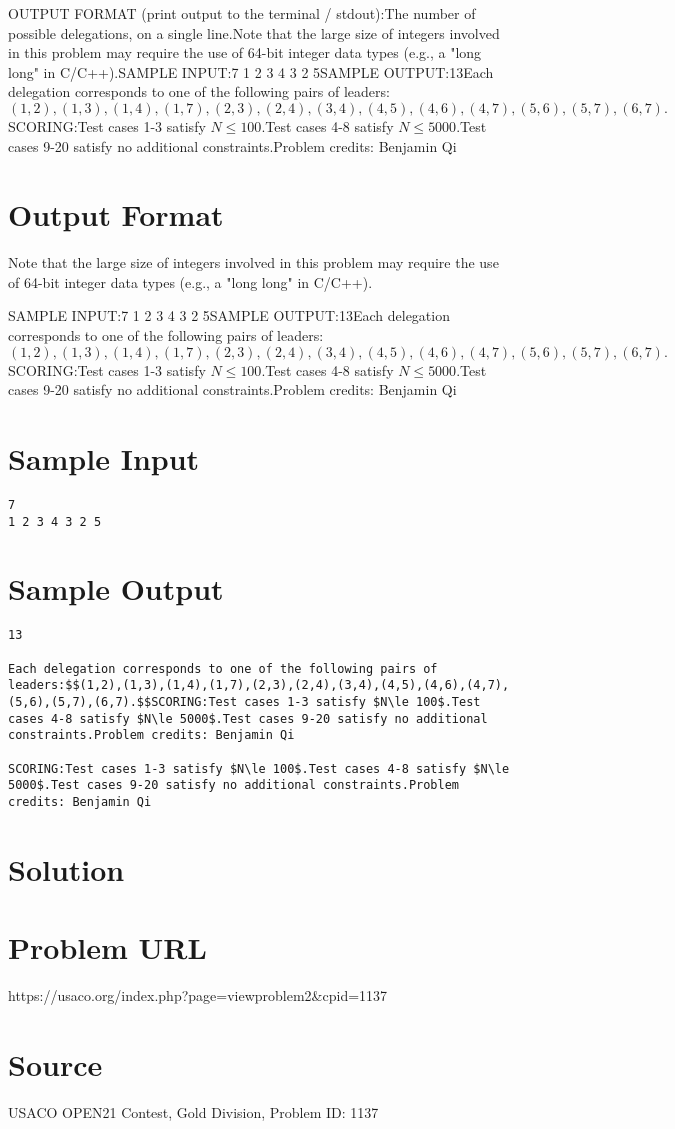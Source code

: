 \documentclass[12pt]{article}
\begin{document}
OUTPUT FORMAT (print output to the terminal / stdout):The number of possible delegations, on a single line.Note that the large size of integers involved in this problem may require the
use of 64-bit integer data types (e.g., a "long long" in C/C++).SAMPLE INPUT:7
1 2 3 4 3 2 5SAMPLE OUTPUT:13Each delegation corresponds to one of the following pairs of leaders:$$(1,2),(1,3),(1,4),(1,7),(2,3),(2,4),(3,4),(4,5),(4,6),(4,7),(5,6),(5,7),(6,7).$$SCORING:Test cases 1-3 satisfy $N\le 100$.Test cases 4-8 satisfy $N\le 5000$.Test cases 9-20 satisfy no additional constraints.Problem credits: Benjamin Qi

\section*{Output Format}
Note that the large size of integers involved in this problem may require the
use of 64-bit integer data types (e.g., a "long long" in C/C++).

SAMPLE INPUT:7
1 2 3 4 3 2 5SAMPLE OUTPUT:13Each delegation corresponds to one of the following pairs of leaders:$$(1,2),(1,3),(1,4),(1,7),(2,3),(2,4),(3,4),(4,5),(4,6),(4,7),(5,6),(5,7),(6,7).$$SCORING:Test cases 1-3 satisfy $N\le 100$.Test cases 4-8 satisfy $N\le 5000$.Test cases 9-20 satisfy no additional constraints.Problem credits: Benjamin Qi

\section*{Sample Input}
\begin{verbatim}
7
1 2 3 4 3 2 5
\end{verbatim}

\section*{Sample Output}
\begin{verbatim}
13

Each delegation corresponds to one of the following pairs of leaders:$$(1,2),(1,3),(1,4),(1,7),(2,3),(2,4),(3,4),(4,5),(4,6),(4,7),(5,6),(5,7),(6,7).$$SCORING:Test cases 1-3 satisfy $N\le 100$.Test cases 4-8 satisfy $N\le 5000$.Test cases 9-20 satisfy no additional constraints.Problem credits: Benjamin Qi

SCORING:Test cases 1-3 satisfy $N\le 100$.Test cases 4-8 satisfy $N\le 5000$.Test cases 9-20 satisfy no additional constraints.Problem credits: Benjamin Qi
\end{verbatim}

\section*{Solution}


\section*{Problem URL}
https://usaco.org/index.php?page=viewproblem2&cpid=1137

\section*{Source}
USACO OPEN21 Contest, Gold Division, Problem ID: 1137
\end{document}
